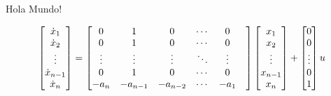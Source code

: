 Hola Mundo!

$$
\begin{bmatrix}
\dot{x}_{1} \\ 
\dot{x}_{2} \\
\vdots \\
\dot{x}_{n-1} \\ 
\dot{x}_{n} \\ 
\end{bmatrix}
=
\begin{bmatrix}
0 & 1 & 0 & \cdots & 0 \\
0 & 1 & 0 & \cdots & 0 \\
\vdots & \vdots & \vdots & \ddots  & \vdots \\
0 & 1 & 0 & \cdots & 0 \\
-a_{n} & -a_{n-1} & -a_{n-2} & \cdots & -a_{1} &
\end{bmatrix}
\begin{bmatrix}
x_{1} \\ 
x_{2} \\
\vdots \\
x_{n-1} \\ 
x_{n} \\ 
\end{bmatrix}
+
\begin{bmatrix}
0 \\
0 \\
\vdots \\
0 \\
1 \\
\end{bmatrix}
u
\\
\\
$$
